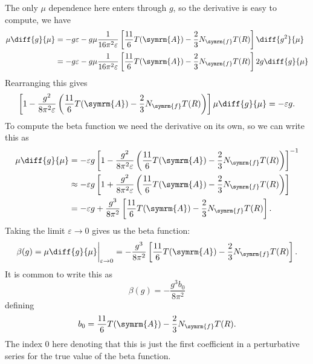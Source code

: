 \documentclass[fleqn]{NotesClass}
\newcommand{\adjointRep}{\symrm{A}}
\newcommand{\numberFermions}{N_{\symrm{f}}}
\begin{document}
    The only \(\mu\) dependence here enters through \(g\), so the derivative is easy to compute, we have
    \begin{align}
        \mu \diff{g}{\mu} &= -g\varepsilon - g\mu \frac{1}{16\pi^2\varepsilon}\left[ \frac{11}{6}T(\adjointRep) - \frac{2}{3}\numberFermions T(R) \right] \diff{g^2}{\mu}\\
        &= -g\varepsilon - g\mu \frac{1}{16\pi^2\varepsilon}\left[ \frac{11}{6}T(\adjointRep) - \frac{2}{3}\numberFermions T(R) \right] 2g\diff{g}{\mu}
    \end{align}
    Rearranging this gives
    \begin{equation}
        \left[ 1 - \frac{g^2}{8\pi^2\varepsilon}\left( \frac{11}{6}T(\adjointRep) - \frac{2}{3}\numberFermions T(R) \right) \right] \mu\diff{g}{\mu} = -\varepsilon g.
    \end{equation}
    To compute the beta function we need the derivative on its own, so we can write this as
    \begin{align}
        \mu\diff{g}{\mu} &= -\varepsilon g \left[ 1 - \frac{g^2}{8\pi^2\varepsilon}\left( \frac{11}{6}T(\adjointRep) - \frac{2}{3}\numberFermions T(R) \right) \right]^{-1}\\
        &\approx -\varepsilon g \left[ 1 + \frac{g^2}{8\pi^2\varepsilon}\left( \frac{11}{6}T(\adjointRep) - \frac{2}{3}\numberFermions T(R) \right) \right]\\
        &= -\varepsilon g + \frac{g^3}{8\pi^2} \left[ \frac{11}{6}T(\adjointRep) - \frac{2}{3}\numberFermions T(R) \right].
    \end{align}
    Taking the limit \(\varepsilon \to 0\) gives us the beta function:
    \begin{equation}
        \beta(g) = \mu\diff{g}{\mu}\bigg|_{\varepsilon \to 0} = -\frac{g^3}{8\pi^2}\left[ \frac{11}{6}T(\adjointRep) - \frac{2}{3}\numberFermions T(R) \right].
    \end{equation}
    It is common to write this as
    \begin{equation}
        \beta(g) = -\frac{g^3 b_0}{8\pi^2}
    \end{equation}
    defining
    \begin{equation}
        b_0 = \frac{11}{6}T(\adjointRep) - \frac{2}{3}\numberFermions T(R).
    \end{equation}
    The index \(0\) here denoting that this is just the first coefficient in a perturbative series for the true value of the beta function.
    
\end{document}
